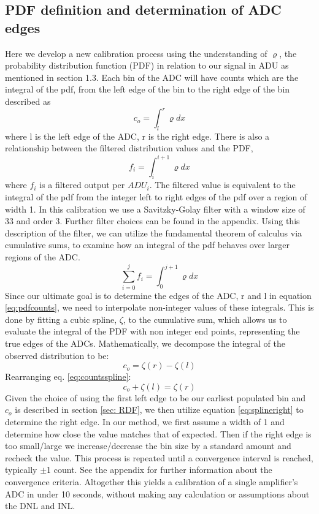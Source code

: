 \documentclass[11pt, letterpaper]{article}
\begin{document}
\subsection{PDF definition and determination of ADC edges} 	
\label{sec:PDFEdges}
\indent

Here we develop a new calibration process using the understanding of $\varrho$, the probability distribution function (PDF) in relation to our signal in ADU as mentioned in section 1.3. 
Each bin of the ADC will have counts which are the integral of the pdf, from the left edge of the bin to the right edge of the bin described as
 \begin{equation}
c_o =  \int_{l}^{r} \varrho dx
\label{eq:pdfcounts}
\end{equation}
where l is the left edge of the ADC, r is the right edge. 
There is also a relationship between the filtered distribution values and the PDF,
 \begin{equation}
f_i =  \int_{i}^{i+1} \varrho dx
\label{eq:pdffilter}
\end{equation}
where $f_{i}$ is a filtered output per $ADU_{i}$. 
The filtered value is equivalent to the integral of the pdf from the integer left to right edges of the pdf over a region of width 1. 
In this calibration we use a Savitzky-Golay filter with a window size of 33 and order 3. 
Further filter choices can be found in the appendix. 
Using this description of the filter, we can utilize the fundamental theorem of calculus via cumulative sums, to examine how an integral of the pdf behaves over larger regions of the ADC. 
 \begin{equation}
\sum_{i=0}^{j} f_i= \int_{0}^{j+1} \varrho dx
\label{eq:fidef}
\end{equation}
Since our ultimate goal is to determine the edges of the ADC, r and l in equation \ref{eq:pdfcounts}, we need to interpolate non-integer values of these integrals. 
This is done by fitting a cubic spline, $ \zeta$, to the cumulative sum, which allows us to evaluate the integral of the PDF with non integer end points, representing the true edges of the ADCs. 
Mathematically, we decompose the integral of the observed distribution to be:
 \begin{equation}
c_o = \zeta(r) - \zeta(l)
\label{eq:countsspline}
\end{equation}
Rearranging eq. \ref{eq:countsspline}: 
 \begin{equation}
c_o + \zeta(l) = \zeta(r)
\label{eq:splineright}
\end{equation}
Given the choice of using the first left edge to be our earliest populated bin and $c_{o}$ is described in section \ref{sec: RDF}, we then utilize equation \ref{eq:splineright} to determine the right edge.
In our method, we first assume a width of 1 and determine how close the value matches that of expected. Then if the right edge is too small/large we increase/decrease the bin size by a standard amount and recheck the value. 
This process is repeated until a convergence interval is reached, typically $\pm$1 count. 
See the appendix for further information about the convergence criteria. 
Altogether this yields a calibration of a single amplifier's ADC in under 10 seconds, without making any calculation or assumptions about the DNL and INL.
\end{document}
